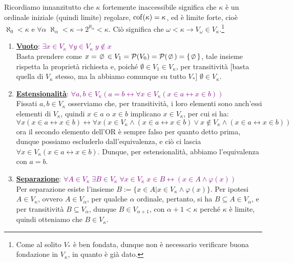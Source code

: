 \begin{soln}
	Ricordiamo innanzitutto che $\kappa$ fortemente inaccessibile significa che $\kappa$ \`e un ordinale iniziale (quindi limite) regolare, $\operatorname{cof}(\kappa) = \kappa$, ed \`e limite forte, cio\`e $\aleph_0 < \kappa$ e $\forall \alpha \; \aleph_\alpha < \kappa \to 2^{\aleph_\alpha} < \kappa$. Ci\`o significa che $\omega < \kappa \to V_\omega \in V_\kappa$.\footnote{Come al solito $V_*$ \`e ben fondata, dunque non \`e necessario verificare buona fondazione in $V_\kappa$, in quanto \`e gi\`a dato.}
	\begin{enumerate}[(1)]
		\item \textbf{\underline{Vuoto}}: \textcolor{purple}{$\exists x \in V_\kappa \; \forall y \in V_\kappa \; y \not \in x$} \\
		Basta prendere come $x = \emptyset \in V_1 = \ps(V_0) = \ps(\emptyset) = \{\emptyset\}$, tale insieme rispetta la propriet\`a richiesta e, poich\'e $\emptyset \in V_1 \in V_\kappa$, per transitivit\`a [basta quella di $V_\kappa$ stesso, ma la abbiamo comunque su tutto $V_*$] $\emptyset \in V_\kappa$.
		\item \textbf{\underline{Estensionalit\`a}}: \textcolor{purple}{$\forall a,b \in V_\kappa (a = b \leftrightarrow \forall x \in V_\kappa (x \in a \leftrightarrow x \in b))$} \\
		Fissati $a,b \in V_\kappa$ osserviamo che, per transitivit\`a, i loro elementi sono anch'essi elementi di $V_\kappa$, quindi $x \in a$ o $x \in b$ implicano $x \in V_\kappa$, per cui si ha:
		\[ \forall x (x \in a \leftrightarrow x \in b) \leftrightarrow \forall x (x \in V_\kappa \land (x \in a \leftrightarrow x \in b) \lor x \not \in V_\kappa \land (x \in a \leftrightarrow x \in b))
			\] 
		ora il secondo elemento dell'OR \`e sempre falso per quanto detto prima, dunque possiamo escluderlo dall'equivalenza, e ci\`o ci lascia $\forall x \in V_\kappa (x \in a \leftrightarrow x \in b)$.
		Dunque, per estensionalit\`a, abbiamo l'equivalenza con $a = b$.
		\item \textbf{\underline{Separazione}}: \textcolor{purple}{$\forall A \in V_\kappa \; \exists B \in V_\kappa \; \forall x \in V_\kappa \; x \in B \leftrightarrow (x \in A \land \varphi(x))$} \\
		Per separazione esiste l'insieme $B :=\{x \in A | x \in V_\kappa \land \varphi(x)\}$. Per ipotesi $A \in V_\kappa$, ovvero $A \in V_{\alpha}$, per qualche $\alpha$ ordinale, pertanto, si ha $B \subseteq A \in V_\alpha$, e per transitivit\`a $B \subseteq V_\alpha$, dunque $B \in V_{\alpha + 1}$, con $\alpha + 1 < \kappa$ perch\'e $\kappa$ \`e limite, quindi otteniamo che $B \in V_\kappa$.

\end{enumerate}
\end{soln}
